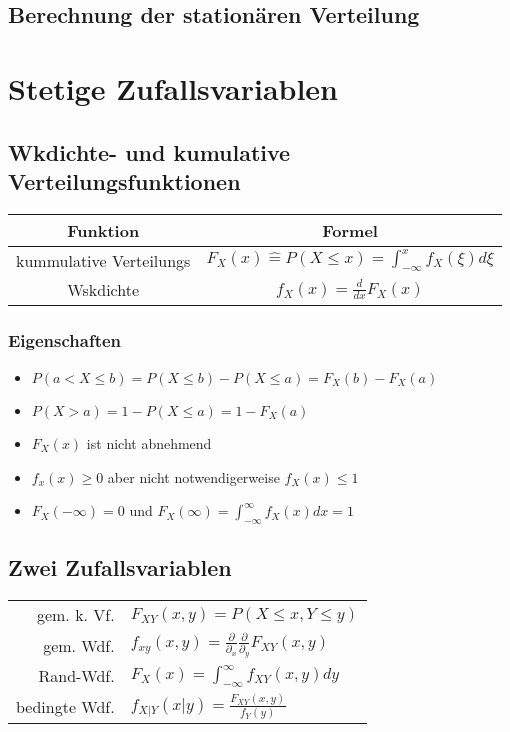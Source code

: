 \documentclass{article}
\begin{document}
\subsection{Berechnung der stationären Verteilung}


\section{Stetige Zufallsvariablen}
\subsection{Wkdichte- und kumulative Verteilungsfunktionen}
\begin{tabular}{c | c}
Funktion & Formel \\ \hline
kummulative Verteilungs& $F_X (x) \hat{=}  P(X \leq x ) = \int_{-\infty}^x f_X(\xi)d\xi $ \\
Wskdichte  &$f_X(x) = \frac{d}{dx} F_X(x)$\\
\end{tabular}

\subsubsection{Eigenschaften}
\begin{itemize}
\item $P(a < X \leq b) = P(X\le b) - P(X \le a) = F_X (b) - F_X(a)$
\item $P(X > a) = 1-P(X \le a) = 1- F_X(a)$
\item $F_X(x) $ ist nicht abnehmend
\item$ f_x(x) \ge 0 $ aber nicht notwendigerweise $f_X(x) \leq 1$
 \item $F_X (-\infty) = 0$ und $ F_X(\infty) = \int_{-\infty}^\infty f_X(x) dx =1$
\end{itemize}

\subsection{Zwei Zufallsvariablen}
\begin{tabular}{r l}

gem. k. Vf.& $F_{XY} (x,y) = P(X \leq x, Y\leq y)$\\
gem. Wdf. & $f_{xy}(x,y) = \frac{\partial}{\partial_x} \frac{\partial}{\partial_y} F_{XY}(x,y)$\\
Rand-Wdf. & $F_X(x) = \int_{-\infty}^\infty f_{XY}(x,y) dy$\\
bedingte Wdf. & $f_{X|Y}(x|y) = \frac{F_{XY}(x,y)}{f_Y(y)}$\\

\end{tabular}
\end{document}
